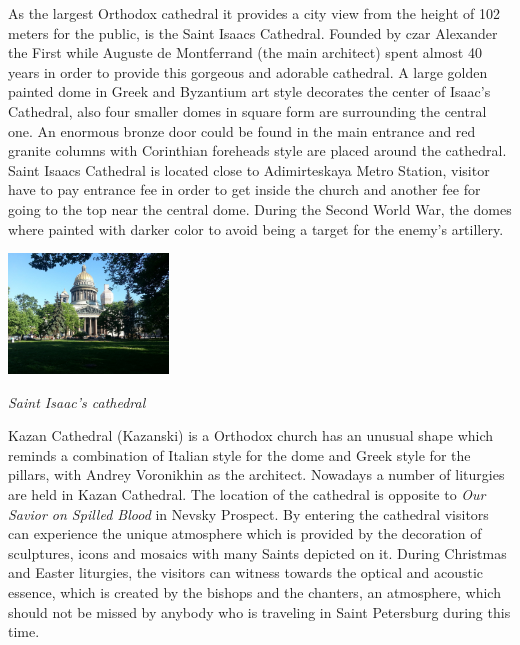 \documentclass[10pt,a4paper]{article} %
\begin{document}
\begin{multicols}{3}
As the largest Orthodox cathedral it provides a city view 
from the height of 102 meters for the public, is the Saint Isaacs Cathedral. 
Founded by czar Alexander the First while Auguste de Montferrand (the main architect) 
spent almost 40 years in order to provide this gorgeous and adorable cathedral. 
A large golden painted dome in Greek and Byzantium art style decorates the 
center of Isaac's Cathedral, 
also four smaller domes in square form are surrounding the central one. 
An enormous bronze door could be found in the main entrance and red granite columns 
with Corinthian foreheads style are placed around the cathedral. 
Saint Isaacs Cathedral is located close to Adimirteskaya Metro Station, 
visitor have to pay entrance fee in order to get inside the church and another 
fee for going to the top near the central dome. 
During the Second World War, the domes where painted with darker color 
to avoid being a target for the enemy's artillery.

\begin{center}
	\includegraphics[width=0.32\textwidth]{media/isaccs_cathedral.jpg}
	\par\textit{Saint Isaac's cathedral}
\end{center}

Kazan Cathedral (Kazanski) is a Orthodox church has an unusual shape which 
reminds a combination of Italian style for the dome and Greek style for the pillars, 
with Andrey Voronikhin as the architect. 
Nowadays a number of liturgies are held in Kazan Cathedral. 
The location of the cathedral is opposite to \textit{Our Savior on Spilled Blood} 
in Nevsky Prospect. 
By entering the cathedral visitors can experience the unique atmosphere 
which is provided by the decoration of sculptures, 
icons and mosaics with many Saints depicted on it. 
During Christmas and Easter liturgies, the visitors can witness towards the optical 
and acoustic essence, which is created by the bishops and the chanters, an atmosphere, 
which should not be missed by anybody who is traveling in Saint Petersburg during this time.


\end{multicols}
\end{document}
